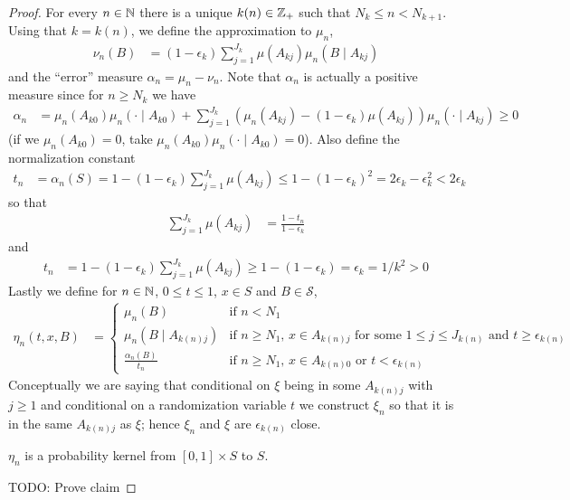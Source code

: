 \begin{proof}
For every $n \in \mathbb{N}$ there is a unique $k(n) \in \mathbb{Z}_+$ such that $N_k \leq n < N_{k+1}$.  Using that $k = k(n)$, we define the approximation to $\mu_n$,
\begin{align*}
\nu_n(B) &= (1- \epsilon_k) \sum_{j=1}^{J_k} \mu(A_{kj}) \mu_n(B \mid A_{kj})
\end{align*}
and the ``error'' measure $\alpha_n = \mu_n - \nu_n$.  Note that $\alpha_n$ is actually a positive measure since for $n \geq N_k$ we have 
\begin{align*}
\alpha_n &= \mu_n(A_{k0}) \mu_n( \cdot \mid A_{k0}) + \sum_{j=1}^{J_k} (\mu_n(A_{kj}) - (1 -\epsilon_k) \mu(A_{kj})) \mu_n(\cdot \mid A_{kj}) \geq 0
\end{align*}
(if we $\mu_n(A_{k0}) = 0$, take $\mu_n(A_{k0}) \mu_n( \cdot \mid A_{k0})=0$).
Also define the normalization constant
\begin{align*}
t_n &= \alpha_n(S) = 1 - (1 - \epsilon_k) \sum_{j=1}^{J_k} \mu(A_{kj}) \leq 1 - (1 - \epsilon_k)^2 = 2\epsilon_k - \epsilon_k^2 < 2 \epsilon_k
\end{align*}
so that
\begin{align*}
\sum_{j=1}^{J_k} \mu(A_{kj}) &= \frac{1 - t_n}{1 - \epsilon_k}
\end{align*}
and 
\begin{align*}
t_n &= 1 - (1 - \epsilon_k) \sum_{j=1}^{J_k} \mu(A_{kj}) \geq 1 - (1 - \epsilon_k) = \epsilon_k = 1/k^2 > 0
\end{align*}
Lastly we define for $n \in \mathbb{N}$, $0 \leq t \leq 1$, $x \in S$ and $B \in \mathcal{S}$,
\begin{align*}
\eta_n(t,x, B) &= \begin{cases}
\mu_n(B) & \text{if $n < N_1$} \\
\mu_n(B \mid A_{k(n) j}) & \text{if $n \geq N_1$, $x \in A_{k(n)j}$ for some $1 \leq j \leq J_{k(n)}$ and $t \geq \epsilon_{k(n)}$} \\
\frac{\alpha_n(B)}{t_n} & \text{if $n \geq N_1$, $x \in A_{k(n)0}$ or $t < \epsilon_{k(n)}$}
\end{cases}
\end{align*}
Conceptually we are saying that conditional on $\xi$ being in some $A_{k(n)j}$ with $j \geq 1$ and conditional on a randomization variable $t$ we construct $\xi_n$ so that it is in the same $A_{k(n)j}$ as $\xi$;  hence $\xi_n$ and $\xi$ are $\epsilon_{k(n)}$ close.

\begin{clm} $\eta_n$ is a probability kernel from $[0,1] \times S$ to $S$.
\end{clm}
TODO: Prove claim



\end{proof}
